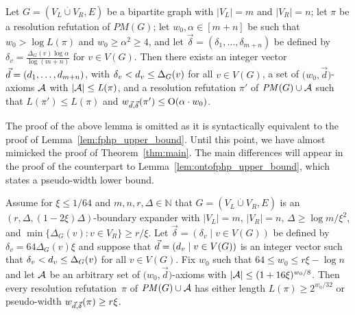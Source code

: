 \documentclass{theoretics}
\newcommand{\bigoh}[1]{\mathrm{O} ( #1 )}
\newcommand{\N}         {\mathbb{N}}
\newcommand{\minofset}[3][:]{\min \{ #2 #1 #3 \}}
\newcommand{\setsize}[1]{\lvert#1\rvert}
\newcommand{\disjointunion}{\overset{.}{\cup}}
\newcommand{\refthm}[1]{Theorem~\ref{#1}}
\newcommand{\reflem}[1]{Lemma~\ref{#1}}
\newcommand{\refpi}{\pi}
\newcommand{\genericformsmall}[2]{\mathit{#1}( #2 )}
\newcommand{\length}[1]{\genericformsmall{L}{#1}}
\newcommand{\width}[2][]{\genericformsmall{W_{#1}}{#2}}
\newcommand{\formulaformat}[1]{\mathit{#1}}
\newcommand{\numpigeons}{m}
\newcommand{\numholes}{n}
\newcommand{\PM}{PM(G)}
\renewcommand{\PM}{\formulaformat{PM}(G)}
\renewcommand{\deg}[2][XXXXXXXXXXXX]{\Delta_{#1}(#2)}
\newcommand{\diff}{\xi}
\newcommand{\ontocdiff}{64}
\newcommand{\GdegMax}{\Delta}
\newcommand{\gdegmax}{\GdegMax}
\newcommand{\V}[1][]{V_{#1}}
\newcommand{\Vl}{\V[L]}
\newcommand{\Vr}{\V[R]}
\newcommand{\Ax}{\ensuremath\mathcal{A}}
\newcommand{\thr}[1]{ \ensuremath d_{{#1}} }
\newcommand{\vecthr}{\vec{d}}
\newcommand{\vecthrdef}[1]{\vecthr = \left(\thr{1}, \ldots, \thr{#1}\right)}
\newcommand{\adv}[1]{\delta_{{#1}}}
\newcommand{\vecadv}{\vec{\delta}}
\newcommand{\vecadvdef}[1]{\vecadv = \left(\adv{1}, \ldots, \adv{#1}\right)}
\newcommand{\fakeaxiom}{$\bigl( w_0, \vecthr \bigr)$-axiom\xspace}
\newcommand{\pseudowidth}{pseudo-width\xspace}
\renewcommand{\width}[1]{\ensuremath w_{\vecthr,\vecadv}( #1 )}
\numberwithin{equation}{section}
\begin{document}
\begin{lemma}\label{lem:ontofphp_upper_bound}
  Let $G=( \Vl \disjointunion \Vr, E)$ be a bipartite graph 
  with $\setsize{\Vl} = \numpigeons$ and 
  $\setsize{\Vr} = \numholes$;
  let $\refpi$ be a resolution refutation of $\PM$;
  let $w_0, \alpha \in [\numpigeons + \numholes]$ be such that 
  $w_0 > \log \length{\refpi}$ and
  $w_0 \ge \alpha^2 \ge 4$,
  and let $\vecadvdef{\numpigeons + \numholes}$ be defined by
  $\adv{v} = \frac{\deg[G]{v} \log \alpha}
  {\log (\numpigeons + \numholes)}$ for $v\in V(G)$.
  Then there exists 
  an integer vector $\vecthrdef{\numpigeons + \numholes}$, with 
  $\adv{v} < \thr{v} \le \deg[G]{v}$ for all 
  $v \in V(G)$, a set of \fakeaxiom{s} $\Ax$ with 
  \mbox{$\setsize{\Ax} \le \length{\refpi}$}, and a resolution refutation 
  $\refpi'$ of $\PM \cup \Ax$ such that 
  $\length{\refpi'} \leq \length{\refpi}$ and
  \mbox{$\width{\refpi'} \le \bigoh{\alpha \cdot w_0}$.}
\end{lemma}





The proof of the above lemma is omitted as it is syntactically equivalent
to the proof of \reflem{lem:fphp_upper_bound}.
Until this point, we have almost mimicked the proof of \refthm{thm:main}.
The main differences will appear in the proof of the
counterpart to \reflem{lem:ontofphp_upper_bound}, 
which states a \pseudowidth lower bound.

\begin{lemma}\label{lem:onto_lower_bound}
  Assume for
  $\diff \le 1/64$ and $m,n,r,\gdegmax \in \N$
  that
  $G=(\Vl \disjointunion \Vr, E)$ 
  is an
  $(r, \GdegMax, \left(1 - 2\diff\right)\GdegMax)$-boundary expander
  with $\setsize{\Vl} = m$, $\setsize{\Vr} = n$,
  $\GdegMax \geq {\log m}/{\diff^2}$, and 
  $\minofset{\deg[G]{v}}{v\in \Vr} \geq {r}/{\diff}$.
  Let $\vecadv = (\adv{v} \mid v \in V(G))$ be defined by
  $\adv{v} = \ontocdiff \deg[G]{v} \diff$ and suppose that
  $\vecthr = (\thr{v} \mid v \in V(G))$
  is an integer vector such
  that $\adv{v} < \thr{v} \leq \deg[G]{v}$ for all $v \in V(G)$.
  Fix $w_0$ such that $64 \leq w_0 \leq r \diff - \log n$ 
  and let $\Ax$ be
  an arbitrary set of \fakeaxiom{s} with
  $\setsize{\Ax} \le (1 + 16\diff)^{w_0/8}$. 
  Then every resolution refutation~$\refpi$ of
  $\PM \cup \Ax$ has either length
  $\length{\refpi} \ge 2^{w_0/32}$ or
  \pseudowidth
  $\width{\refpi} \ge r \diff$.
\end{lemma}
\end{document}
